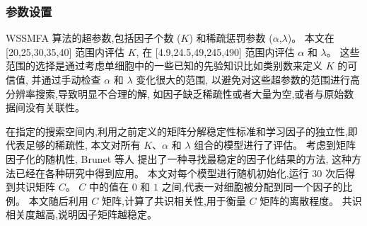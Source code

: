 \begin{table}[!htbp]
    \caption{使用的公开数据集描述} 
    \label{tab:dataset}
\end{table}

\subsubsection{参数设置}
WSSMFA 算法的超参数,包括因子个数 ($K$) 和稀疏惩罚参数 ($\alpha$,$\lambda$)。
本文在 [20,25,30,35,40] 范围内评估 $K$, 在 [4.9,24.5,49,245,490] 范围内评估 $\alpha$ 和 $\lambda$。
这些范围的选择是通过考虑单细胞中的一些已知的先验知识比如类别数来定义 $K$ 的可信值,
并通过手动检查 $\alpha$ 和 $\lambda$ 变化很大的范围,
以避免对这些超参数的范围进行高分辨率搜索,导致明显不合理的解,
如因子缺乏稀疏性或者大量为空,或者与原始数据间没有关联性。

在指定的搜索空间内,利用之前定义的矩阵分解稳定性标准和学习因子的独立性,即代表足够的稀疏性,
本文对所有 $K$、$\alpha$ 和 $\lambda$ 组合的模型进行了评估。
考虑到矩阵因子化的随机性, Brunet 等人  提出了一种寻找最稳定的因子化结果的方法,
这种方法已经在各种研究中得到应用。
本文对每个模型进行随机初始化,运行 30 次后得到共识矩阵 $C$。
$C$ 中的值在 $0$ 和 $1$ 之间,代表一对细胞被分配到同一个因子的比例。
本文随后利用 $C$ 矩阵,计算了共识相关性,用于衡量 $C$ 矩阵的离散程度。
共识相关度越高,说明因子矩阵越稳定。

